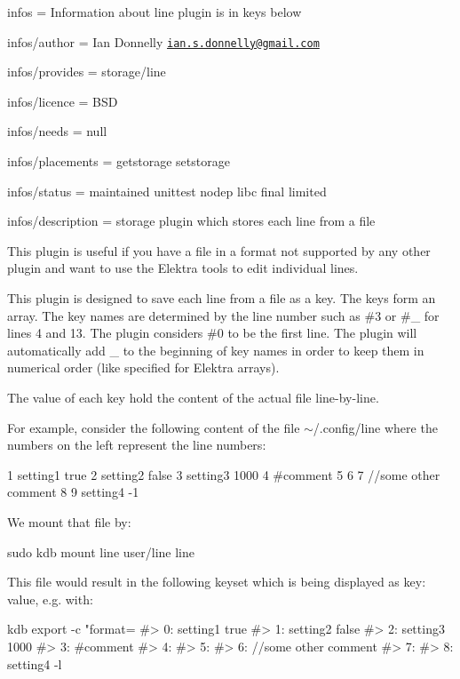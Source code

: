 
\begin{DoxyItemize}
\item infos = Information about line plugin is in keys below
\item infos/author = Ian Donnelly \href{mailto:ian.s.donnelly@gmail.com}{\tt ian.\+s.\+donnelly@gmail.\+com}
\item infos/provides = storage/line
\item infos/licence = B\+SD
\item infos/needs = null
\item infos/placements = getstorage setstorage
\item infos/status = maintained unittest nodep libc final limited
\item infos/description = storage plugin which stores each line from a file
\end{DoxyItemize}

This plugin is useful if you have a file in a format not supported by any other plugin and want to use the Elektra tools to edit individual lines.

This plugin is designed to save each line from a file as a key. The keys form an array. The key names are determined by the line number such as {\ttfamily \#3} or {\ttfamily \#\+\_} for lines 4 and 13. The plugin considers {\ttfamily \#0} to be the first line. The plugin will automatically add {\ttfamily \+\_\+} to the beginning of key names in order to keep them in numerical order (like specified for Elektra arrays).

The value of each key hold the content of the actual file line-\/by-\/line.

For example, consider the following content of the file {\ttfamily $\sim$/.config/line} where the numbers on the left represent the line numbers\+:


\begin{DoxyCode}
1  setting1 true
2  setting2 false
3  setting3 1000
4  #comment
5
6
7  //some other comment
8
9  setting4 -1
\end{DoxyCode}


We mount that file by\+:


\begin{DoxyCode}
sudo kdb mount line user/line line
\end{DoxyCode}


This file would result in the following keyset which is being displayed as {\ttfamily key\+: value}, e.\+g. with\+:


\begin{DoxyCode}
kdb export -c "format=%
#> 0: setting1 true
#> 1: setting2 false
#> 2: setting3 1000
#> 3: #comment
#> 4:
#> 5:
#> 6: //some other comment
#> 7:
#> 8: setting4 -l
\end{DoxyCode}


